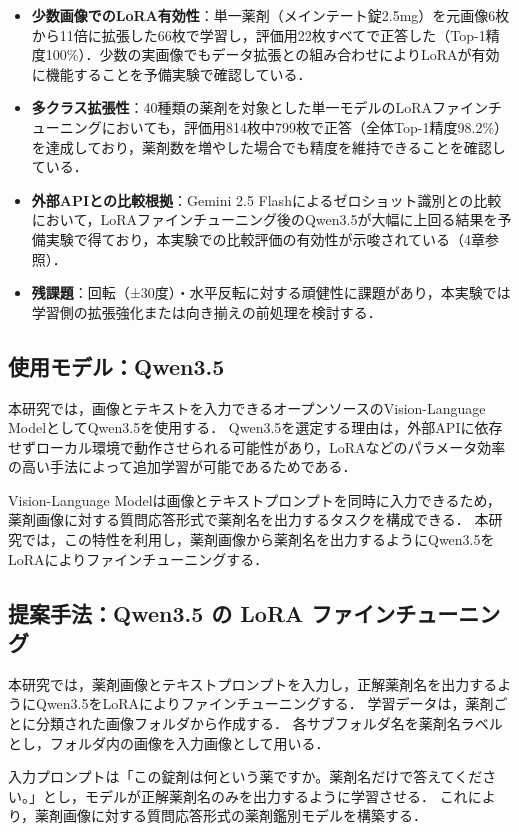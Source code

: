 \documentclass{ltjsarticle}
\begin{document}
\begin{itemize}
  \item \textbf{少数画像でのLoRA有効性}：単一薬剤（メインテート錠2.5mg）を元画像6枚から11倍に拡張した66枚で学習し，評価用22枚すべてで正答した（Top-1精度100\%）．少数の実画像でもデータ拡張との組み合わせによりLoRAが有効に機能することを予備実験で確認している．
  \item \textbf{多クラス拡張性}：40種類の薬剤を対象とした単一モデルのLoRAファインチューニングにおいても，評価用814枚中799枚で正答（全体Top-1精度98.2\%）を達成しており，薬剤数を増やした場合でも精度を維持できることを確認している．
  \item \textbf{外部APIとの比較根拠}：Gemini 2.5 Flashによるゼロショット識別との比較において，LoRAファインチューニング後のQwen3.5が大幅に上回る結果を予備実験で得ており，本実験での比較評価の有効性が示唆されている（4章参照）．
  \item \textbf{残課題}：回転（±30度）・水平反転に対する頑健性に課題があり，本実験では学習側の拡張強化または向き揃えの前処理を検討する．
\end{itemize}

\subsection{使用モデル：Qwen3.5}

本研究では，画像とテキストを入力できるオープンソースのVision-Language ModelとしてQwen3.5を使用する．
Qwen3.5を選定する理由は，外部APIに依存せずローカル環境で動作させられる可能性があり，LoRAなどのパラメータ効率の高い手法によって追加学習が可能であるためである．

Vision-Language Modelは画像とテキストプロンプトを同時に入力できるため，薬剤画像に対する質問応答形式で薬剤名を出力するタスクを構成できる．
本研究では，この特性を利用し，薬剤画像から薬剤名を出力するようにQwen3.5をLoRAによりファインチューニングする．

\subsection{提案手法：Qwen3.5 の LoRA ファインチューニング}

本研究では，薬剤画像とテキストプロンプトを入力し，正解薬剤名を出力するようにQwen3.5をLoRAによりファインチューニングする．
学習データは，薬剤ごとに分類された画像フォルダから作成する．
各サブフォルダ名を薬剤名ラベルとし，フォルダ内の画像を入力画像として用いる．

入力プロンプトは「この錠剤は何という薬ですか。薬剤名だけで答えてください。」とし，モデルが正解薬剤名のみを出力するように学習させる．
これにより，薬剤画像に対する質問応答形式の薬剤鑑別モデルを構築する．
\end{document}
